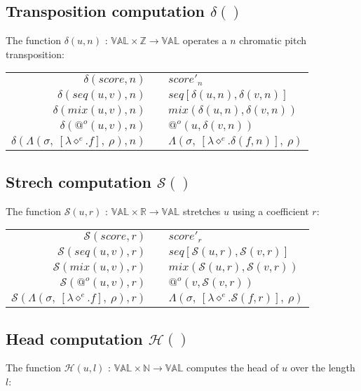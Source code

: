 \documentclass[10pt,a4paper,frenchb]{article}
\makeatletter
\newcommand{\var}[1]	{\ensuremath{\diamond^#1}}
\newcommand{\val}		{\ensuremath{\mathbb{VAL}}}
\newcommand{\closure}	{\ensuremath{\Lambda}}
\newcommand{\applyop}	{\ensuremath{@}}
\newcommand{\noredex}	{\ensuremath{\applyop^o}}
\newcommand{\sdomain}[3]{$#1 \times #2 \rightarrow #3$}
\newcommand{\envsym}			{\ensuremath{\rho}}
\newcommand{\closenv}[2][f]		{\closure(#2,\ [\lambda \var{e}.#1],\ \envsym)}
\newcommand{\apexpr}[1] 	{#1(u, v)}
\newcommand{\head}			{\ensuremath{\mathcal H}}
\newcommand{\transp}		{\ensuremath{\delta}}
\renewcommand{\stretch}	{\ensuremath{\mathcal S}}
\newcommand{\bounds}		{\ensuremath{\sigma}}
\newcommand{\evaltable}[1][$\rightarrow$]	  {\begin{center} \begin{tabular*}{0.9\linewidth}{rc@{ #1 }l}}
\newcommand{\evaltablend}  		{\end{tabular*}\end{center}}
\makeatother
\begin{document}
\subsection{Transposition computation $\transp()$}
The function $\transp(u,n)$ :  \sdomain{\val}{\mathbb{Z}}{\val} operates a $n$ chromatic pitch transposition:

\evaltable
 \hline
 $\transp(score,n)$				& & $score'_n$\\
 $\transp(\apexpr{seq},n)$		& & $seq[\transp(u, n), \transp(v, n)]$ \\
 $\transp(\apexpr{mix},n)$ 		& & $mix(\transp(u, n), \transp(v, n))$ \\
 $\transp(\noredex (u,v),n)$ 	& & $\noredex(u,\transp(v,n))$ \\
 $\transp(\closenv{\bounds},n)$ 	& & $\closenv[\transp(f,n)]{\bounds}$ \\
 \hline
\evaltablend

\subsection{Strech computation $\stretch()$}
The function $\stretch(u,r)$ :  \sdomain{\val}{\mathbb{R}}{\val} stretches $u$ using a coefficient $r$:

\evaltable
 \hline
 $\stretch(score,r)$					& & $score'_r$\\
 $\stretch(\apexpr{seq},r)$			& & $seq[\stretch(u, r), \stretch(v, r)]$ \\
 $\stretch(\apexpr{mix},r)$ 			& & $mix(\stretch(u, r), \stretch(v, r))$ \\
 $\stretch(\noredex (u,v),r)$ 		& & $\noredex(v,\stretch(v,r))$ \\
 $\stretch(\closenv{\bounds},r)$ 	& & $\closenv[\stretch(f,r)]{\bounds}$ \\
 \hline
\evaltablend

\subsection{Head computation $\head()$}
The function $\head(u,l)$ :  \sdomain{\val}{\mathbb{N}}{\val} computes the head of $u$ over the length $l$:
\end{document}
